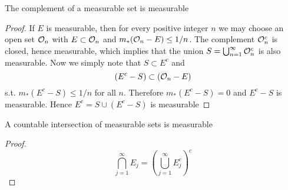 \documentclass[11pt]{article}
\begin{document}
\begin{proposition}[]
The complement of a measurable set is measurable
\end{proposition}

\begin{proof}
If \(E\) is measurable, then for every positive integer \(n\) we may choose an
open set \(\mathcal{O}_n\) with \(E\subset\mathcal{O}_n\) and \(m_*(\mathcal{O}_n-E)\le1/n\). The
complement \(\mathcal{O}_n^c\) is closed, hence measurable, which implies that the
union \(S=\bigcup_{n=1}^\infty\mathcal{O}_n^c\) is also measurable. Now we simply
note that \(S\subset E^c\) and
\begin{equation*}
(E^c-S)\subset(\mathcal{O}_n-E)
\end{equation*}
s.t. \(m_*(E^c-S)\le1/n\) for all \(n\). Therefore \(m_*(E^c-S)=0\) and \(E^c-S\) is
measurable. Hence \(E^c=S\cup(E^c-S)\) is measurable
\end{proof}

\begin{proposition}[]
A countable intersection of measurable sets is measurable
\end{proposition}
\begin{proof}
\begin{equation*}
\displaystyle\bigcap_{j=1}^\infty E_j=(\displaystyle\bigcup_{j=1}^\infty E_j^c)^c
\end{equation*}
\end{proof}
\end{document}
